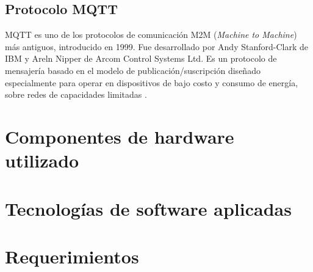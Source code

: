 \subsection{Protocolo MQTT}
\label{sec:Protocolo MQTT}
MQTT es uno de los protocolos de comunicación M2M (\textit{Machine to Machine}) más antiguos, introducido en 1999. Fue desarrollado por Andy Stanford-Clark de IBM y Areln Nipper de Arcom Control Systems Ltd\citep{8088251}. Es un protocolo de mensajería basado en el modelo de publicación/suscripción diseñado especialmente para operar en dispositivos de bajo costo y consumo de energía, sobre redes de capacidades limitadas \citep{4554519}.

\section{Componentes de hardware utilizado}
\label{sec:Hardware utilizado}

\section{Tecnologías de software aplicadas}
\label{sec:Software aplicado}

\section{Requerimientos}
\label{sec:Requerimientos}

